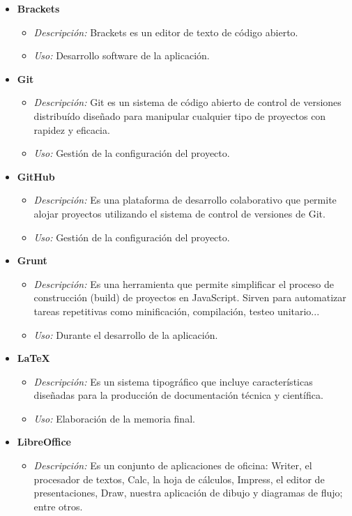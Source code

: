 \begin{itemize}
\item \textbf{Brackets}
\begin{itemize}
\item \textit{Descripción: }Brackets es un editor de texto de código abierto\cite{brackets}.
\item \textit{Uso: }Desarrollo software de la aplicación.
\end{itemize}
\item \textbf{Git}
\begin{itemize}
\item \textit{Descripción: }Git es un sistema de código abierto de control de versiones distribuído diseñado para manipular cualquier tipo de proyectos con rapidez y eficacia\cite{git}.
\item \textit{Uso: }Gestión de la configuración del proyecto.
\end{itemize}
\item \textbf{GitHub}
\begin{itemize}
\item \textit{Descripción: }Es una plataforma de desarrollo colaborativo que permite alojar proyectos utilizando el sistema de control de versiones de Git\cite{github}.  
\item \textit{Uso: }Gestión de la configuración del proyecto.
\end{itemize}
\item \textbf{Grunt}
\begin{itemize}
\item \textit{Descripción: }Es una herramienta que permite simplificar el proceso de construcción (build) de proyectos en JavaScript. Sirven para automatizar tareas repetitivas como minificación, compilación, testeo unitario...\cite{grunt}
\item \textit{Uso: }Durante el desarrollo de la aplicación.
\end{itemize}
\item \textbf{\LaTeX}
\begin{itemize}
\item \textit{Descripción: }Es un sistema tipográfico que incluye características diseñadas para la producción de documentación técnica y científica\cite{latex}.
\item \textit{Uso: }Elaboración de la memoria final.
\end{itemize}
\item \textbf{LibreOffice}
\begin{itemize}
\item \textit{Descripción: }Es un conjunto de aplicaciones de oficina: Writer, el procesador de textos, Calc, la hoja de cálculos, Impress, el editor de presentaciones, Draw, nuestra aplicación de dibujo y diagramas de flujo; entre otros\cite{libreoffice}. 

\end{itemize}
\end{itemize}
